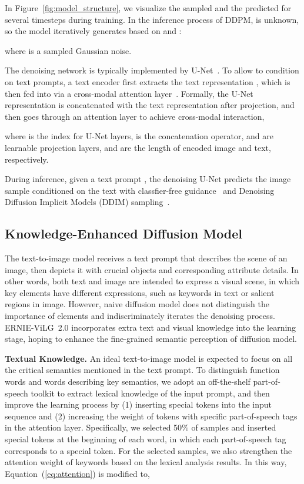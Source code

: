 \documentclass[10pt,twocolumn,letterpaper]{article}
\begin{document}
In Figure~\ref{fig:model_structure}, we visualize the sampled  and the predicted  for several timesteps during training.
In the inference process of DDPM,  is unknown, so the model iteratively generates  based on  and :

where  is a sampled Gaussian noise.

The denoising network  is typically implemented by U-Net~\cite{DBLP:conf/nips/HoJA20}. 
To allow  to condition on text prompts, a text encoder  first extracts the text representation , which is then fed into  via a cross-modal attention layer~\cite{DBLP:conf/icml/NicholDRSMMSC22}.
Formally, the U-Net representation  is concatenated with the text representation  after projection, and then goes through an attention layer to achieve cross-modal interaction, 


where  is the index for U-Net layers,  is the concatenation operator,  and  are learnable projection layers,  and  are the length of encoded image and text, respectively.

During inference, given a text prompt , the denoising U-Net  predicts the image sample  conditioned on the text  with classfier-free guidance~\cite{DBLP:journals/corr/abs-2207-12598} and Denoising Diffusion Implicit Models (DDIM) sampling~\cite{DBLP:conf/iclr/SongME21}.

\subsection{Knowledge-Enhanced Diffusion Model}

The text-to-image model receives a text prompt that describes the scene of an image, then depicts it with crucial objects and corresponding attribute details.
In other words, both text and image are intended to express a visual scene, in which key elements have different expressions, such as keywords in text or salient regions in image.
However, naive diffusion model does not distinguish the importance of elements and indiscriminately iterates the denoising process. ERNIE-ViLG~2.0 incorporates extra text and visual knowledge into the learning stage, hoping to enhance the fine-grained semantic perception of diffusion model.



\noindent\textbf{Textual Knowledge.}
An ideal text-to-image model is expected to focus on all the critical semantics mentioned in the text prompt.
To distinguish function words and words describing key semantics, we adopt an off-the-shelf part-of-speech toolkit to extract lexical knowledge of the input prompt, and then improve the learning process by (1) inserting special tokens into the input sequence and (2) increasing the weight of tokens with specific part-of-speech tags in the attention layer.
Specifically, we selected 50\% of samples and inserted special tokens at the beginning of each word, in which each part-of-speech tag corresponds to a special token.
For the selected samples, we also strengthen the attention weight of keywords based on the lexical analysis results. 
In this way, Equation~(\ref{eq:attention}) is modified to,
\end{document}
